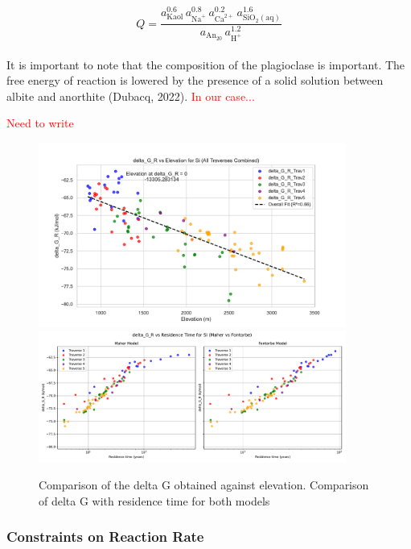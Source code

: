 \begin{equation}
    Q = \frac{a_{\mathrm{Kaol}}^{0.6}\,a_{\mathrm{Na}^{+}}^{0.8}\,a_{\mathrm{Ca}^{2+}}^{0.2}\,a_{\mathrm{SiO_{2}(aq)}}^{1.6}}
           {a_{\mathrm{An_{20}}}\,a_{\mathrm{H}^{+}}^{1.2}}
\end{equation}\\

It is important to note that the composition of the plagioclase is important. The free energy of reaction is lowered by the presence of a solid solution between albite and anorthite (Dubacq, 2022). \textcolor{red}{In our case...}

\newpage

\textcolor{red}{Need to write }
\begin{figure}[H]
    \centering
    \includegraphics[width=0.9\textwidth]{delta_G_R_Si_combined_fit.pdf}
    \includegraphics[width=0.9\textwidth]{delta_G_R_Si_time_Maher_vs_Fontorbe.pdf}
    \caption{Comparison of the delta G obtained against elevation. Comparison of delta G with residence time for both models}
    \label{fig:discussion8}
\end{figure}

\FloatBarrier


\newpage

\subsubsection*{Constraints on Reaction Rate}

